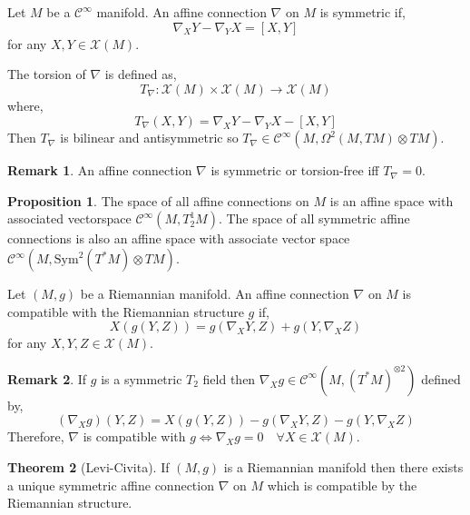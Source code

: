 \documentclass[12pt]{extarticle}
\theoremstyle{definition}
\newtheorem{theorem}{Theorem}[section]
\newtheorem{proposition}[theorem]{Proposition}
\newtheorem{remark}{Remark}
\newenvironment{definition}[1][Definition:]{\begin{trivlist}
\item[\hskip \labelsep {\bfseries #1}]}{\end{trivlist}}
\newcommand{\C}[1]{\mathcal{C}^{#1}}
\begin{document}
\begin{definition}
Let $M$ be a $\C{\infty}$ manifold. An affine connection $\nabla$ on $M$ is symmetric if,
\[ \nabla_X Y - \nabla_Y X = [X, Y] \]
for any $X, Y \in \mathscr{X}(M)$. 
\end{definition}

\begin{definition}
The torsion of $\nabla$ is defined as,
\[ T_{\nabla} : \mathscr{X}(M) \times \mathscr{X}(M) \to \mathscr{X}(M) \]
where,
\[ T_{\nabla}(X, Y) = \nabla_X Y - \nabla_Y X - [X, Y] \]
Then $T_{\nabla}$ is bilinear and antisymmetric so $T_{\nabla} \in \C{\infty}(M, \Omega^2(M, TM) \otimes TM)$. 
\end{definition}

\begin{remark}
An affine connection $\nabla$ is symmetric or torsion-free iff $T_{\nabla} = 0$.
\end{remark}

\begin{proposition}
The space of all affine connections on $M$ is an affine space with associated vectorspace $\C{\infty}(M, T^1_2 M)$. The space of all symmetric affine connections is also an affine space with associate vector space $\C{\infty}(M, \mathrm{Sym}^2(T^*M) \otimes TM)$. 
\end{proposition}

\begin{definition}
Let $(M, g)$ be a Riemannian manifold. An affine connection $\nabla$ on $M$ is compatible with the Riemannian structure $g$ if,
\[ X(g(Y,Z)) = g(\nabla_X Y, Z) + g(Y, \nabla_X Z) \]
for any $X,Y,Z \in \mathscr{X}(M)$. 
\end{definition}

\begin{remark}
If $g$ is a symmetric $T_2$ field then $\nabla_X g \in \C{\infty}(M, (T^* M)^{\otimes 2})$ defined by,
\[ (\nabla_X g)(Y, Z) = X(g(Y, Z)) - g(\nabla_X Y, Z) - g(Y, \nabla_X Z) \]
Therefore, $\nabla$ is compatible with $g \iff \nabla_X g = 0 \quad \forall X \in \mathscr{X}(M)$. 
\end{remark}

\begin{theorem}[Levi-Civita]
If $(M, g)$ is a Riemannian manifold then there exists a unique symmetric affine connection $\nabla$ on $M$ which is compatible by the Riemannian structure. 
\end{theorem}
\end{document}

